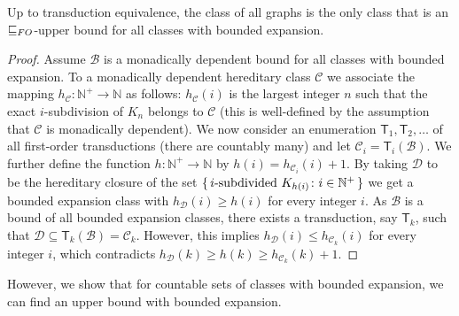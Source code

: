 \documentclass{lmcs}
\newcommand{\Cc}{\mathscr{C}}
\newcommand{\Dd}{\mathscr{D}}
\newcommand{\N}{\mathbb{N}}
\renewcommand{\FO}{{\rm FO}}
\theoremstyle{definition}
\begin{document}
\begin{prop} \label{prop:nomax}
	Up to transduction equivalence, the class of all graphs is the only class that is an $\sqsubseteq_\FO$-upper bound for all classes with bounded expansion.
\end{prop}
\begin{proof}
	Assume $\mathscr B$ is a monadically dependent bound for all classes with bounded expansion.
	To a monadically dependent hereditary class $\mathscr C$ we associate the mapping $h_{\mathscr C}\colon\mathbb N^+\rightarrow\mathbb N$ as follows: $h_{\mathscr C}(i)$ is the largest integer $n$ such that the exact $i$-subdivision of $K_n$ belongs to $\mathscr C$ (this is well-defined by the assumption that $\Cc$ is monadically dependent).  
	We now consider an enumeration $\mathsf T_1,\mathsf  T_2,\dots$ of all first-order transductions (there are countably many) and let $\mathscr C_i=\mathsf T_i(\mathscr B)$. We further define the function  $h \colon \mathbb N^+\rightarrow\mathbb{N}$  by $h(i)=h_{\mathscr C_i}(i)+1$. 
	By taking $\Dd$ to be the hereditary closure of the set $\set{i\text{-subdivided } K_{h(i)} \colon i \in \N^+}$ we get a bounded expansion class with $h_{\mathscr D}(i)\geq h(i)$ for every integer $i$. 
	As $\mathscr B$ is a bound of all bounded expansion classes, there exists a transduction, say $\mathsf T_k$, such that 
	$\mathscr D\subseteq \mathsf T_k(\mathscr B)=\Cc_k$. However, this implies $h_{\mathscr D}(i)\leq h_{\Cc_k}(i)$ for every integer $i$, which contradicts 
	$h_{\mathscr D}(k)\geq h(k)\geq h_{\Cc_k}(k)+1$.
\end{proof}	


However, we show that for countable sets of classes with bounded expansion, we can find an upper bound with bounded expansion.
\end{document}
